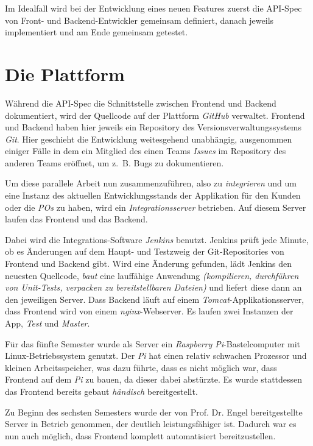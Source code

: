 \documentclass[a4paper, 11pt]{article}
\begin{document}
Im Idealfall wird bei der Entwicklung eines neuen Features zuerst die API-Spec
von Front- und Backend-Entwickler gemeinsam definiert, danach jeweils
implementiert und am Ende gemeinsam getestet.

\section{Die Plattform}

Während die API-Spec die Schnittstelle zwischen Frontend und Backend
dokumentiert, wird der Quellcode auf der Plattform \emph{GitHub} verwaltet.
Frontend und Backend haben hier jeweils ein Repository des
Versionsverwaltungssystems \emph{Git}. Hier geschieht die Entwicklung
weitesgehend unabhängig, ausgenommen einiger Fälle in dem ein Mitglied des
einen Teams \emph{Issues} im Repository des anderen Teams eröffnet, um z.~B.
Bugs zu dokumentieren.

Um diese parallele Arbeit nun zusammenzuführen, also zu \emph{integrieren} und
um eine Instanz des aktuellen Entwicklungsstands der Applikation für den Kunden
oder die \emph{POs} zu haben, wird ein \emph{Integrationsserver} betrieben.
Auf diesem Server laufen das Frontend und das Backend.

Dabei wird die Integrations-Software \emph{Jenkins} benutzt. Jenkins prüft jede
Minute, ob es Änderungen auf dem Haupt- und Testzweig der Git-Repositories von
Frontend und Backend gibt. Wird eine Änderung gefunden, lädt Jenkins den
neuesten Quellcode, \emph{baut} eine lauffähige Anwendung \emph{(kompilieren,
durchführen von Unit-Tests, verpacken zu bereitstellbaren Dateien)} und liefert
diese dann an den jeweiligen Server. Dass Backend läuft auf einem
\emph{Tomcat}-Applikationsserver, dass Frontend wird von einem
\emph{nginx}-Webserver. Es laufen zwei Instanzen der App, \emph{Test} und \emph{Master}.

Für das fünfte Semester wurde als Server ein \emph{Raspberry Pi}-Bastelcomputer
mit Linux-Betriebssystem genutzt. Der \emph{Pi} hat einen relativ schwachen
Prozessor und kleinen Arbeitsspeicher, was dazu führte, dass es nicht möglich
war, dass Frontend auf dem \emph{Pi} zu bauen, da dieser dabei abstürzte. Es
wurde stattdessen das Frontend bereits gebaut \emph{händisch} bereitgestellt.

Zu Beginn des sechsten Semesters wurde der von Prof. Dr. Engel bereitgestellte
Server in Betrieb genommen, der deutlich leistungsfähiger ist. Dadurch war es
nun auch möglich, dass Frontend komplett automatisiert bereitzustellen. 
\end{document}
